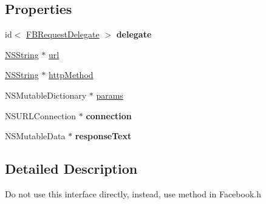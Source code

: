 \subsection*{\-Properties}
\begin{DoxyCompactItemize}
\item 
\hypertarget{interface_f_b_request_aa356110f91a673514bb24669008dc18e}{
id$<$ \hyperlink{protocol_f_b_request_delegate-p}{\-F\-B\-Request\-Delegate} $>$ {\bfseries delegate}}
\label{interface_f_b_request_aa356110f91a673514bb24669008dc18e}

\item 
\hyperlink{class_n_s_string}{\-N\-S\-String} $\ast$ \hyperlink{interface_f_b_request_a8f68797f342263f201de828425f91279}{url}
\item 
\hyperlink{class_n_s_string}{\-N\-S\-String} $\ast$ \hyperlink{interface_f_b_request_a950203edc0388db7985ce58fd1373b47}{http\-Method}
\item 
\-N\-S\-Mutable\-Dictionary $\ast$ \hyperlink{interface_f_b_request_aff8df7430c532dd3502e7b39f07c9065}{params}
\item 
\hypertarget{interface_f_b_request_a86d7f56b76ad434987a2d2dfda75c51d}{
\-N\-S\-U\-R\-L\-Connection $\ast$ {\bfseries connection}}
\label{interface_f_b_request_a86d7f56b76ad434987a2d2dfda75c51d}

\item 
\hypertarget{interface_f_b_request_a895cbb425e4323984df79202ba3d01c4}{
\-N\-S\-Mutable\-Data $\ast$ {\bfseries response\-Text}}
\label{interface_f_b_request_a895cbb425e4323984df79202ba3d01c4}

\end{DoxyCompactItemize}


\subsection{\-Detailed \-Description}
\-Do not use this interface directly, instead, use method in \-Facebook.\-h 

